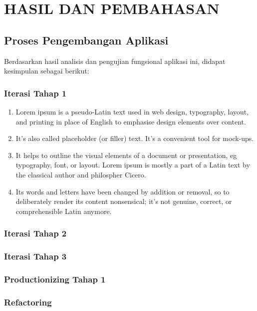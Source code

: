 
\chapter{HASIL DAN PEMBAHASAN}

\section{Proses Pengembangan Aplikasi}
  Berdasarkan hasil analisis dan pengujian fungsional aplikasi ini, didapat kesimpulan sebagai berikut:

  \subsection{Iterasi Tahap 1}

    \begin{enumerate}
      \item Lorem ipsum is a pseudo-Latin text used in web design, typography, layout, and printing in place of English to emphasise design elements over content. 
      
      \item It's also called placeholder (or filler) text. It's a convenient tool for mock-ups. 
      
      \item It helps to outline the visual elements of a document or presentation, eg typography, font, or layout. Lorem ipsum is mostly a part of a Latin text by the classical author and philospher Cicero.

      \item Its words and letters have been changed by addition or removal, so to deliberately render its content nonsensical; it's not genuine, correct, or comprehensible Latin anymore. 
    \end{enumerate}

  \subsection{Iterasi Tahap 2}
  \subsection{Iterasi Tahap 3}
  \subsection{Productionizing Tahap 1}
  \subsection{Refactoring}
